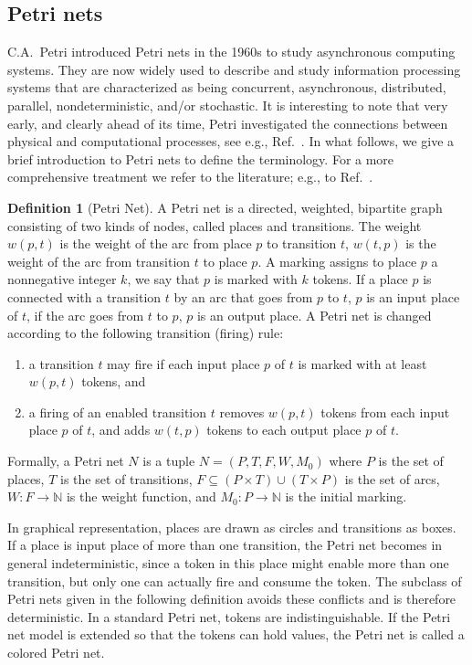 \documentclass[pre,showpacs,showkeys,preprint]{revtex4}
\theoremstyle{definition}
\newtheorem{defn}{Definition}
\begin{document}
\subsection{Petri nets}

C.A.~Petri introduced Petri nets in the 1960s to study asynchronous computing systems.
They are now widely used to describe and study information processing systems
that are characterized as being concurrent, asynchronous, distributed, parallel, nondeterministic,
and/or stochastic.
It is interesting to note that very early, and clearly ahead of its time, Petri investigated
the connections between physical and computational processes, see e.g., Ref.~\cite{petri-82}.
In what follows, we give a brief introduction to Petri nets to define the terminology.
For a more comprehensive treatment we refer to the literature; e.g., to Ref.~\cite{Murata89}.

\begin{defn}[Petri Net]
A Petri net is a directed, weighted, bipartite graph consisting of two kinds of nodes,
called places and transitions.
The weight $w(p,t)$ is the weight of the arc from place $p$ to transition $t$,
$w(t,p)$ is the weight of the arc from transition $t$ to place $p$.
A marking assigns to place $p$ a nonnegative integer $k$, we say that $p$ is marked with
$k$ tokens.
If a place $p$ is connected with a transition $t$ by an arc that goes from $p$ to $t$,
$p$ is an input place of $t$, if the arc goes from $t$ to $p$, $p$ is an output place.
A Petri net is changed according to the following transition (firing) rule:
\begin{enumerate}
\item
a transition $t$ may fire if each input place $p$ of $t$ is marked with at least
$w(p,t)$ tokens, and
\item
a firing of an enabled transition $t$ removes $w(p,t)$ tokens from each input place $p$ of $t$,
and adds $w(t,p)$ tokens to each output place $p$ of $t$.
\end{enumerate}
Formally, a Petri net $N$ is a tuple $N=(P,T,F,W,M_0)$ where
$P$ is the set of places, $T$ is the set of transitions,
$F \subseteq (P \times T) \cup (T \times P)$ is the set of arcs,
$W: F \rightarrow \mathbb{N}$ is the weight function,
and $M_0: P \rightarrow \mathbb{N}$ is the initial marking.
\end{defn}

In graphical representation, places are drawn as circles and transitions as boxes.
If a place is input place of more than one transition, the Petri net becomes in general
indeterministic, since a token in this place might enable more than one transition,
but only one can actually fire and consume the token.
The subclass of Petri nets given in the following definition avoids these conflicts and is therefore deterministic.
In a standard Petri net, tokens are indistinguishable.
If the Petri net model is extended so that the tokens can hold values, the Petri net is called a colored Petri net.
\end{document}
